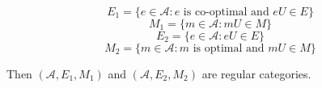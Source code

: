 $$E_1 = \{e \in \mathcal{A}: e \text{ is co-optimal and } eU \in E\}$$
$$M_1 = \{m \in \mathcal{A}: mU \in M\}$$
$$E_2 = \{e \in \mathcal{A}: eU \in E\}$$
$$M_2 = \{m \in \mathcal{A}: m \text{ is optimal and } mU \in M\}$$

Then $(\mathcal{A}, E_1, M_1)$ and $(\mathcal{A}, E_2, M_2)$ are regular categories.